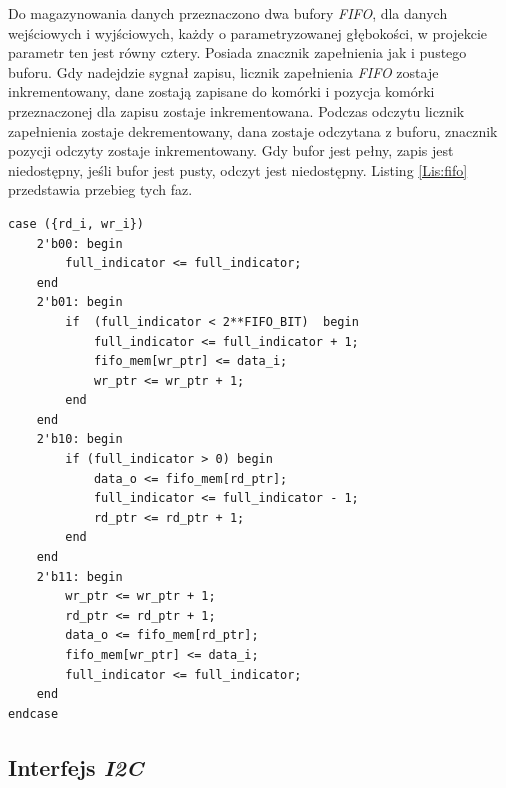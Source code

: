 \documentclass[11pt,a4paper]{article}
\begin{document}
Do magazynowania danych przeznaczono dwa bufory \textit{FIFO}, dla danych wejściowych i wyjściowych, każdy o parametryzowanej głębokości, w projekcie parametr ten jest równy cztery. Posiada znacznik zapełnienia jak i pustego buforu. Gdy nadejdzie sygnał zapisu, licznik zapełnienia \textit{FIFO} zostaje inkrementowany, dane zostają zapisane do komórki i pozycja komórki przeznaczonej dla zapisu zostaje inkrementowana. Podczas odczytu licznik zapełnienia zostaje dekrementowany, dana zostaje odczytana z buforu, znacznik pozycji odczyty zostaje inkrementowany. Gdy bufor jest pełny, zapis jest niedostępny, jeśli bufor jest pusty, odczyt jest niedostępny. Listing \ref{Lis:fifo} przedstawia przebieg tych faz.\\
 			 \begin{minipage}{\textwidth}
\begin{scriptsize}
\begin{lstlisting}[label=Lis:fifo,caption=Model \textit{FIFO}]
case ({rd_i, wr_i})
	2'b00: begin
		full_indicator <= full_indicator;
	end
	2'b01: begin
		if  (full_indicator < 2**FIFO_BIT)	begin
			full_indicator <= full_indicator + 1;
			fifo_mem[wr_ptr] <= data_i;
			wr_ptr <= wr_ptr + 1;
		end
	end
	2'b10: begin
		if (full_indicator > 0)	begin
			data_o <= fifo_mem[rd_ptr];
			full_indicator <= full_indicator - 1;
			rd_ptr <= rd_ptr + 1;
		end
	end
	2'b11: begin
		wr_ptr <= wr_ptr + 1;
		rd_ptr <= rd_ptr + 1;
		data_o <= fifo_mem[rd_ptr];
		fifo_mem[wr_ptr] <= data_i;
		full_indicator <= full_indicator;
	end
endcase
\end{lstlisting}
\end{scriptsize}
\end{minipage}
		

	\subsection{Interfejs \textit{I2C}}
\end{document}
